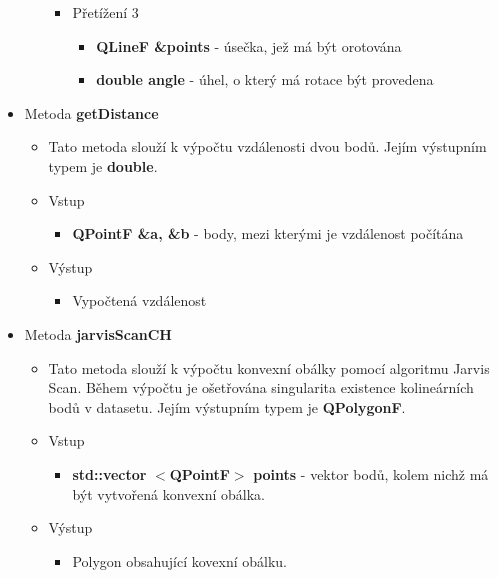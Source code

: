 \documentclass[a4paper, 12pt]{article}
\begin{document}
\begin{itemize}
\begin{itemize}
\begin{itemize}
					\item Přetížení 3
						\begin{itemize}
							\item \textbf{QLineF \&points} - úsečka, jež má být orotována
							\item \textbf{double angle} - úhel, o který má rotace být provedena
 						\end{itemize}					
				\end{itemize}
			
		\end{itemize}

	\item Metoda \textbf{getDistance}
		\begin{itemize}
			\item Tato metoda slouží k výpočtu vzdálenosti dvou bodů. Jejím výstupním typem je \textbf{double}.
			\item Vstup
				\begin{itemize}
					\item \textbf{QPointF \&a, \&b} - body, mezi kterými je vzdálenost počítána
				\end{itemize}
			\item Výstup
				\begin{itemize}	
					\item Vypočtená vzdálenost
				\end{itemize}
		\end{itemize}

	\item Metoda \textbf{jarvisScanCH}
		\begin{itemize}
			\item Tato metoda slouží k výpočtu konvexní obálky pomocí algoritmu Jarvis Scan. Během výpočtu je ošetřována singularita existence kolineárních bodů v datasetu. Jejím výstupním typem je \textbf{QPolygonF}.
			\item Vstup
				\begin{itemize}
					\item \textbf{std::vector} $<$\textbf{QPointF}$>$ \textbf{points} - vektor bodů, kolem nichž má být vytvořená konvexní obálka.
				\end{itemize}
			\item Výstup
				\begin{itemize}
					\item Polygon obsahující kovexní obálku.
				\end{itemize} 
		\end{itemize}


\end{itemize}
\end{document}
